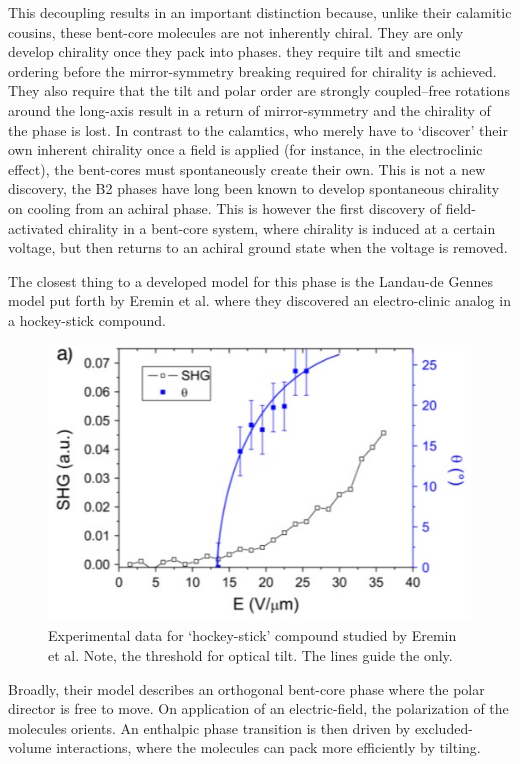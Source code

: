 \documentclass[aagreenthesis]{subfiles}
\begin{document}
This decoupling results in 
an important distinction because, unlike their calamitic cousins, these
bent-core molecules are not inherently chiral. They are only develop chirality
once they pack into phases. they require tilt and smectic ordering
before the mirror-symmetry breaking required for chirality is achieved. They
also require that the tilt and polar order are strongly coupled--free rotations
around the long-axis result in a return of mirror-symmetry and the chirality of
the phase is lost. In contrast to the calamtics, who merely have to `discover'
their own inherent chirality once a field is applied (for instance, in the
electroclinic effect), the bent-cores must spontaneously create their own. This
is not a new discovery, the B2 phases\cite{link_spontaneous_1997} have long been
known to develop spontaneous chirality on cooling from an achiral phase. This
is however
the first discovery of field-activated chirality in a bent-core system, where
chirality is induced at a certain voltage, but then returns to an achiral ground
state when the voltage is removed.


The closest thing to a developed model for this phase is the Landau-de Gennes
model put forth by Eremin et al.\cite{eremin2008electrically} where they
discovered an electro-clinic analog in a hockey-stick compound. 
\begin{figure}
    \centering
    \includegraphics[width=\textwidth]{./figs/pal30/fromPapers/tiltVfield.jpg}
    \caption{\label{fig:achiralTilt} Experimental data for `hockey-stick'
    compound studied by Eremin et al.\cite{eremin2008electrically} Note, the threshold for optical tilt. The lines guide the only.}
\end{figure}
Broadly, their model describes an orthogonal bent-core phase where the polar
director is free to move. On application of an electric-field, the polarization
of the molecules orients. An enthalpic phase transition
is then driven by excluded-volume interactions, where the molecules can pack
more efficiently by tilting. 
\end{document}
